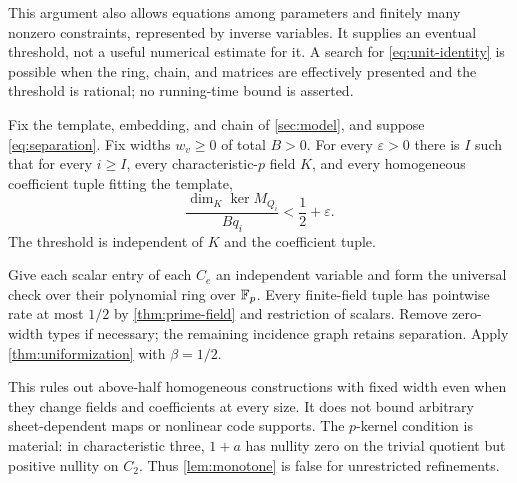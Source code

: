 This argument also allows equations among parameters and finitely
many nonzero constraints, represented by inverse variables. It supplies
an eventual threshold, not a useful numerical estimate for it. A
search for \eqref{eq:unit-identity} is possible when the ring, chain,
and matrices are effectively presented and the threshold is rational;
no running-time bound is asserted.

\begin{theorem}\label{thm:fixed-width}
\notformalized
Fix the template, embedding, and chain of \cref{sec:model}, and
suppose \eqref{eq:separation}. Fix widths $w_v\ge0$ of total $B>0$.
For every $\varepsilon>0$ there is $I$ such that for every $i\ge I$,
every characteristic-$p$ field $K$, and every homogeneous coefficient
tuple fitting the template,
\[
 \frac{\dim_K\ker M_{Q_i}}{Bq_i}<\frac12+\varepsilon.
\]
The threshold is independent of $K$ and the coefficient tuple.
\end{theorem}
\begin{informalproof}
Give each scalar entry of each $C_e$ an independent variable and
form the universal check over their polynomial ring over $\mathbb{F}_p$.
Every finite-field tuple has pointwise rate at most $1/2$ by
\cref{thm:prime-field} and restriction of scalars. Remove zero-width
types if necessary; the remaining incidence graph retains separation.
Apply \cref{thm:uniformization} with $\beta=1/2$.
\end{informalproof}

This rules out above-half homogeneous constructions with fixed width
even when they change fields and coefficients at every size. It does
not bound arbitrary sheet-dependent maps or nonlinear code supports.
The $p$-kernel condition is material: in characteristic three, $1+a$
has nullity zero on the trivial quotient but positive nullity on $C_2$.
Thus \cref{lem:monotone} is false for unrestricted refinements.

